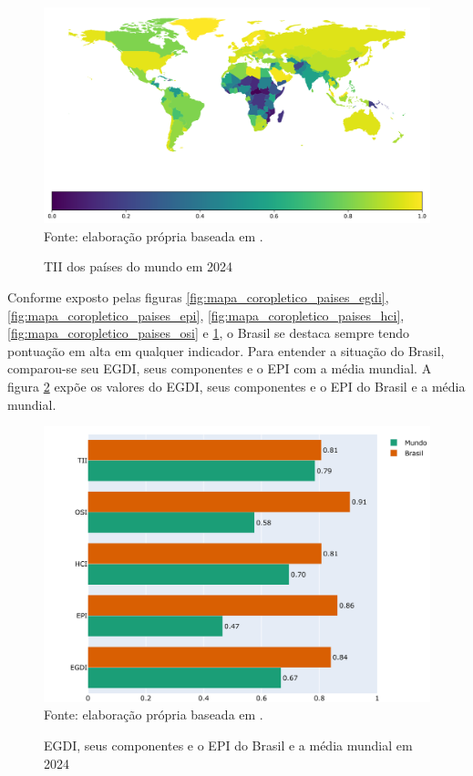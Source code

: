 \begin{figure}[H]
	\centering
	\caption{TII dos países do mundo em 2024}
	\includegraphics[width=1\linewidth]{figuras/mapa_coropletico_paises_tii}
	\label{fig:mapa_coropletico_paises_tii}
	\footnotesize{Fonte: elaboração própria baseada em \cite{ONU_EGDI_dados}.}
\end{figure}

Conforme exposto pelas figuras \ref{fig:mapa_coropletico_paises_egdi}, \ref{fig:mapa_coropletico_paises_epi}, \ref{fig:mapa_coropletico_paises_hci}, \ref{fig:mapa_coropletico_paises_osi} e \ref{fig:mapa_coropletico_paises_tii}, o Brasil se destaca sempre tendo pontuação em alta em qualquer indicador. Para entender a situação do Brasil, comparou-se seu EGDI, seus componentes e o EPI com a média mundial. A figura \ref{fig:comparacao_egdi_brasil_mundo} expõe os valores do EGDI, seus componentes e o EPI do Brasil e a média mundial.

\begin{figure}[H]
	\centering
	\caption{EGDI, seus componentes e o EPI do Brasil e a média mundial em 2024}
	\includegraphics[width=1\linewidth]{figuras/comparacao_egdi_brasil_mundo}
	\label{fig:comparacao_egdi_brasil_mundo}
	\footnotesize{Fonte: elaboração própria baseada em \cite{ONU_EGDI_dados}.}
\end{figure}

